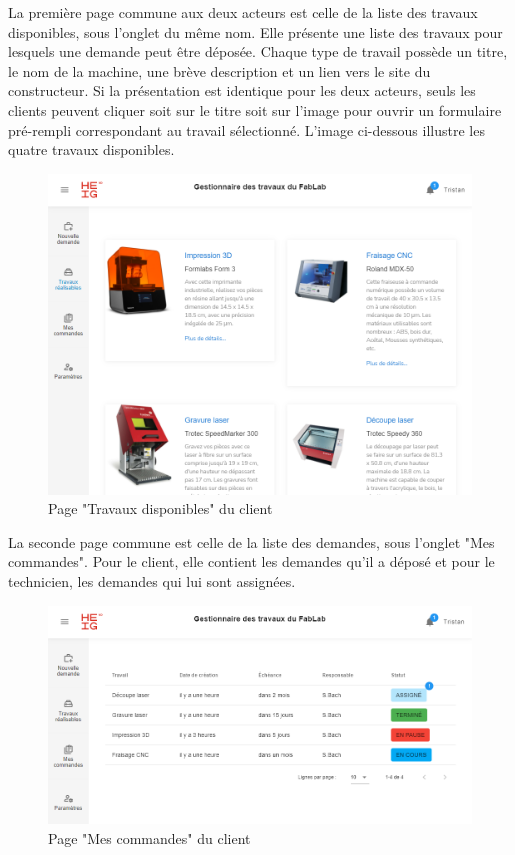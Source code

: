 \documentclass[
    iai, %
    eai, %
]{heig-tb}
\begin{document}
\newpage
La première page commune aux deux acteurs est celle de la liste des travaux disponibles, sous l'onglet du même nom. Elle présente une liste des travaux pour lesquels une demande peut être déposée.
Chaque type de travail possède un titre, le nom de la machine, une brève description et un lien vers le site du constructeur. Si la présentation est identique pour les deux acteurs, seuls les clients peuvent cliquer soit sur le titre soit sur l'image pour ouvrir un formulaire pré-rempli correspondant au travail sélectionné.
L'image ci-dessous illustre les quatre travaux disponibles.

\begin{figure}[h]
  \includegraphics[width=14cm]{ui_joblist_page.PNG}
  \caption{Page "Travaux disponibles" du client}
\end{figure}

La seconde page commune est celle de la liste des demandes, sous l'onglet "Mes commandes". Pour le client, elle contient les demandes qu'il a déposé et pour le technicien, les demandes qui lui sont assignées.

\begin{figure}[h]
  \includegraphics[width=14cm]{ui_myjobs_client.PNG}
  \caption{Page "Mes commandes" du client}
\end{figure}
\end{document}
